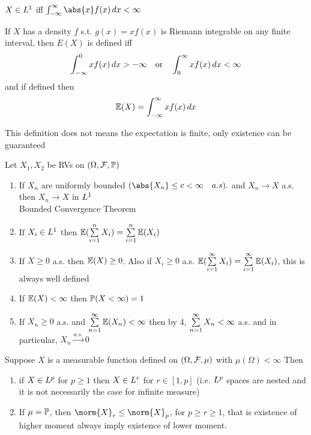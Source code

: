 \newpage
\begin{cor}
$X\in L^{1}$ iff $\inti \abs{x}f(x) \diff x < \infty$
\end{cor}
\begin{cor}
If $X$ has a density $f$ s.t. $g(x)= xf(x)$ is Riemann integrable on any finite interval, then $E(X)$ is defined iff
\begin{equation*}
    \int_{-\infty}^0 x f(x) \mathop{}\!d x > -\infty \quad\text{or}\quad \int_{0}^\infty x f(x) \mathop{}\!d x < \infty
\end{equation*} and if defined then
\begin{equation*}
    \mathbb{E}(X) = \int_{-\infty}^{\infty} xf(x) \mathop{}\!d x
\end{equation*}
\end{cor}
\begin{rem}
This definition does not means the expectation is finite, only existence can be guaranteed
\end{rem}
\begin{prop}
Let $X_1, X_2$ be RVs on $(\Omega, \mathcal{F}, \mathbb{P})$
\begin{enumerate}
    \item If $X_n$ are uniformly bounded $(\abs{X_n}\leq c < \infty \quad a.s).$ and $X_n \rightarrow X$ a.s. then $X_n \rightarrow X$ in $L^{1}$ \\
    Bounded Convergence Theorem
    \item If $X_i \in L^{1}$ then $\mathbb{E}(\sum\limits_{i=1}^n X_i) = \sum\limits_{i=1}^n \mathbb{E}(X_i)$
    \item If $X\geq 0 $ a.s. then $\mathbb{E}(X) \geq 0$. Also if $X_i\geq 0$ a.s. $\mathbb{E}(\sum\limits_{i=1}^\infty X_i) = \sum\limits_{i=1}^\infty \mathbb{E}(X_i)$, this is always well defined
    \item If $\mathbb{E}(X) < \infty$ then $\mathbb{P}(X < \infty ) = 1$
    \item If $X_n \geq 0$ a.s. and $\sum\limits_{n=1}^\infty \mathbb{E}(X_n) < \infty$ then by 4, $\sum\limits_{n=1}^\infty X_n < \infty$ a.s. and in particular, $X_n\xrightarrow{a.s.}0$
\end{enumerate}
\end{prop}
\newpage
\begin{prop}
Suppose $X$ is a measurable function defined on $(\Omega,\mathcal{F}, \mu)$ with $\mu(\Omega)<\infty$ Then
\begin{enumerate}
    \item if $X\in L^{p}$ for $p\geq1$ then $X\in L^{r}$ for $r \in [1,p]$ (i.e. $L^{p}$ spaces are nested and it is not necessarily the case for infinite measure)
    \item If $\mu = \mathbb{P}$, then $\norm{X}_r \leq \norm{X}_p$, for $p \geq r \geq 1$, that is existence of higher moment always imply existence of lower moment.
\end{enumerate}
\end{prop}
